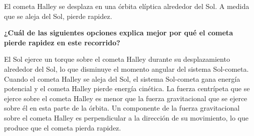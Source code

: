 El cometa Halley se desplaza en una órbita elíptica alrededor del Sol. A medida que se aleja del Sol, pierde rapidez.

\textbf{¿Cuál de las siguientes opciones explica mejor por qué el cometa pierde rapidez en este recorrido?}

\begin{choices}
    \choice El Sol ejerce un torque sobre el cometa Halley durante su desplazamiento alrededor del Sol, lo que disminuye el momento angular del sistema Sol-cometa.
    \CorrectChoice Cuando el cometa Halley se aleja del Sol, el sistema Sol-cometa gana energía potencial y el cometa Halley pierde energía cinética.
    \choice La fuerza centrípeta que se ejerce sobre el cometa Halley es menor que la fuerza gravitacional que se ejerce sobre él en esta parte de la órbita.
    \choice Un componente de la fuerza gravitacional sobre el cometa Halley es perpendicular a la dirección de su movimiento, lo que produce que el cometa pierda rapidez.
\end{choices}
